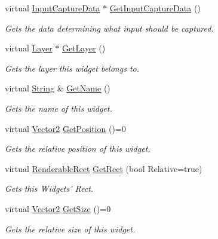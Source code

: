 \begin{DoxyCompactItemize}
virtual \hyperlink{classphys_1_1UI_1_1InputCaptureData}{InputCaptureData} $\ast$ \hyperlink{classphys_1_1UI_1_1Widget_a900184fbe7af51581d6bddafb45d953a}{GetInputCaptureData} ()
\begin{DoxyCompactList}\small\item\em Gets the data determining what input should be captured. \item\end{DoxyCompactList}\item 
virtual \hyperlink{classphys_1_1UI_1_1Layer}{Layer} $\ast$ \hyperlink{classphys_1_1UI_1_1Widget_a33f97d7da0ac48a35006cb71676e6c2e}{GetLayer} ()
\begin{DoxyCompactList}\small\item\em Gets the layer this widget belongs to. \item\end{DoxyCompactList}\item 
virtual \hyperlink{namespacephys_aa03900411993de7fbfec4789bc1d392e}{String} \& \hyperlink{classphys_1_1UI_1_1Widget_a35d6e7ce60a9b295d8659345627cf7e0}{GetName} ()
\begin{DoxyCompactList}\small\item\em Gets the name of this widget. \item\end{DoxyCompactList}\item 
virtual \hyperlink{classphys_1_1Vector2}{Vector2} \hyperlink{classphys_1_1UI_1_1Widget_a3e464b028b0d1b5755923b8790260c33}{GetPosition} ()=0
\begin{DoxyCompactList}\small\item\em Gets the relative position of this widget. \item\end{DoxyCompactList}\item 
virtual \hyperlink{structphys_1_1UI_1_1RenderableRect}{RenderableRect} \hyperlink{classphys_1_1UI_1_1Widget_a0a09859c063ac222d0e736af5050e556}{GetRect} (bool Relative=true)
\begin{DoxyCompactList}\small\item\em Gets this Widgets' Rect. \item\end{DoxyCompactList}\item 
virtual \hyperlink{classphys_1_1Vector2}{Vector2} \hyperlink{classphys_1_1UI_1_1Widget_a07039c19e57de314147ce066417da0a2}{GetSize} ()=0
\begin{DoxyCompactList}\small\item\em Gets the relative size of this widget. \item\end{DoxyCompactList}\item 

\end{DoxyCompactItemize}
